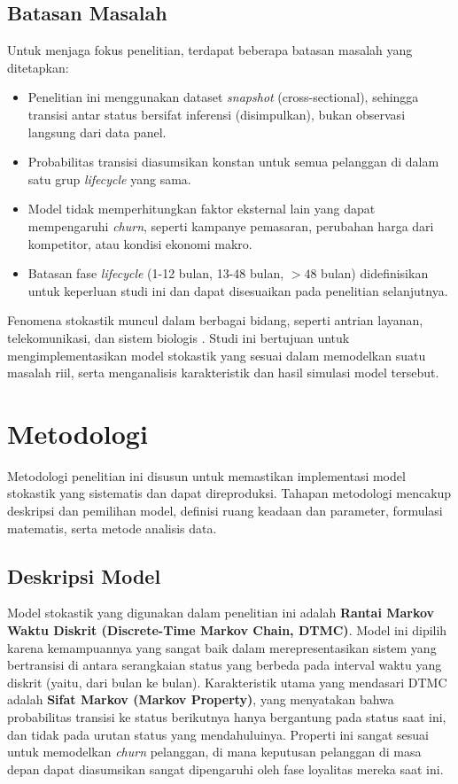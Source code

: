 \documentclass[a4paper,12pt]{article}
\begin{document}
\subsection{Batasan Masalah}
Untuk menjaga fokus penelitian, terdapat beberapa batasan masalah yang ditetapkan:
\begin{itemize}
    \item Penelitian ini menggunakan dataset \textit{snapshot} (cross-sectional), sehingga transisi antar status bersifat inferensi (disimpulkan), bukan observasi langsung dari data panel.
    \item Probabilitas transisi diasumsikan konstan untuk semua pelanggan di dalam satu grup \textit{lifecycle} yang sama.
    \item Model tidak memperhitungkan faktor eksternal lain yang dapat mempengaruhi \textit{churn}, seperti kampanye pemasaran, perubahan harga dari kompetitor, atau kondisi ekonomi makro.
    \item Batasan fase \textit{lifecycle} (1-12 bulan, 13-48 bulan, $> 48$ bulan) didefinisikan untuk keperluan studi ini dan dapat disesuaikan pada penelitian selanjutnya.
\end{itemize}

Fenomena stokastik muncul dalam berbagai bidang, seperti antrian layanan, telekomunikasi, dan sistem biologis \citep{ross2014introduction}. Studi ini bertujuan untuk mengimplementasikan model stokastik yang sesuai dalam memodelkan suatu masalah riil, serta menganalisis karakteristik dan hasil simulasi model tersebut.

\section{Metodologi}
Metodologi penelitian ini disusun untuk memastikan implementasi model stokastik yang sistematis dan dapat direproduksi. Tahapan metodologi mencakup deskripsi dan pemilihan model, definisi ruang keadaan dan parameter, formulasi matematis, serta metode analisis data.

\subsection{Deskripsi Model}
Model stokastik yang digunakan dalam penelitian ini adalah \textbf{Rantai Markov Waktu Diskrit (Discrete-Time Markov Chain, DTMC)}. Model ini dipilih karena kemampuannya yang sangat baik dalam merepresentasikan sistem yang bertransisi di antara serangkaian status yang berbeda pada interval waktu yang diskrit (yaitu, dari bulan ke bulan). Karakteristik utama yang mendasari DTMC adalah \textbf{Sifat Markov (Markov Property)}, yang menyatakan bahwa probabilitas transisi ke status berikutnya hanya bergantung pada status saat ini, dan tidak pada urutan status yang mendahuluinya. Properti ini sangat sesuai untuk memodelkan \textit{churn} pelanggan, di mana keputusan pelanggan di masa depan dapat diasumsikan sangat dipengaruhi oleh fase loyalitas mereka saat ini.
\end{document}
